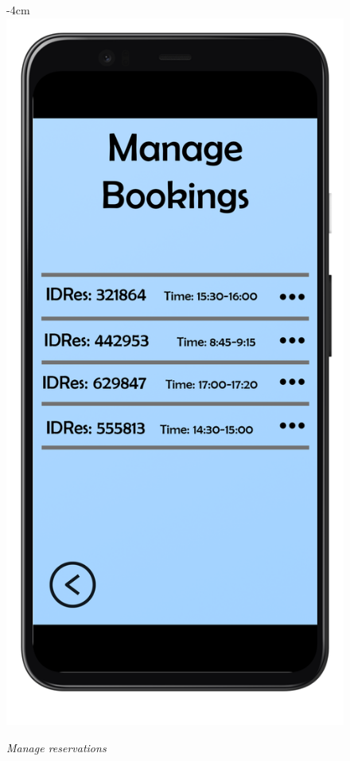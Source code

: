 \documentclass{article}
\begin{document}
			\begin{figure}[H]
			\begin{adjustwidth} {-4cm}{}
				\centering
				\includegraphics[scale=0.45]{../Mockups/ManageBookings.png}\\
			\end{adjustwidth}
			\caption{\emph{Manage reservations}}
			\end{figure}
		
\end{document}
